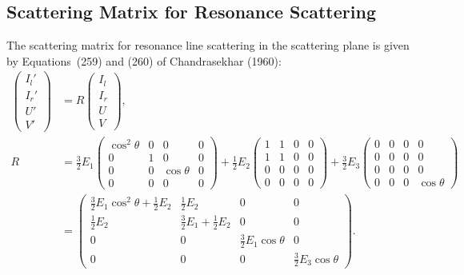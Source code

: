 \documentclass[english,a4paper]{my_memo}
\begin{document}
\subsection{Scattering Matrix for Resonance Scattering}

The scattering matrix for resonance line scattering in the
scattering plane is given by Equations~(259) and (260) of
Chandrasekhar (1960):
\begin{align*}
\left(\begin{array}{c} I_{l}'\\ I_{r}'\\ U'\\ V'\end{array}\right)
& = R\left(\begin{array}{c} I_{l}\\ I_{r}\\ U\\ V\end{array}\right),\\
R & = \frac{3}{2}E_{1}\left(\begin{array}{cccc}
\cos^{2}\theta & 0 & 0 & 0\\
0 & 1 & 0 & 0\\
0 & 0 & \cos\theta & 0\\
0 & 0 & 0 & 0
\end{array}\right)
+\frac{1}{2}E_{2}\left(\begin{array}{cccc}
1 & 1 & 0 & 0\\
1 & 1 & 0 & 0\\
0 & 0 & 0 & 0\\
0 & 0 & 0 & 0
\end{array}\right)
+\frac{3}{2}E_{3}\left(\begin{array}{cccc}
0 & 0 & 0 & 0\\
0 & 0 & 0 & 0\\
0 & 0 & 0 & 0\\
0 & 0 & 0 & \cos\theta
\end{array}\right)\\[2pt]
& = \left(\begin{array}{cccc}
\tfrac{3}{2}E_{1}\cos^{2}\theta+\tfrac{1}{2}E_{2} & \tfrac{1}{2}E_{2} & 0 & 0\\
\tfrac{1}{2}E_{2} & \tfrac{3}{2}E_{1}+\tfrac{1}{2}E_{2} & 0 & 0\\
0 & 0 & \tfrac{3}{2}E_{1}\cos\theta & 0\\
0 & 0 & 0 & \tfrac{3}{2}E_{3}\cos\theta
\end{array}\right).
\end{align*}
\end{document}
